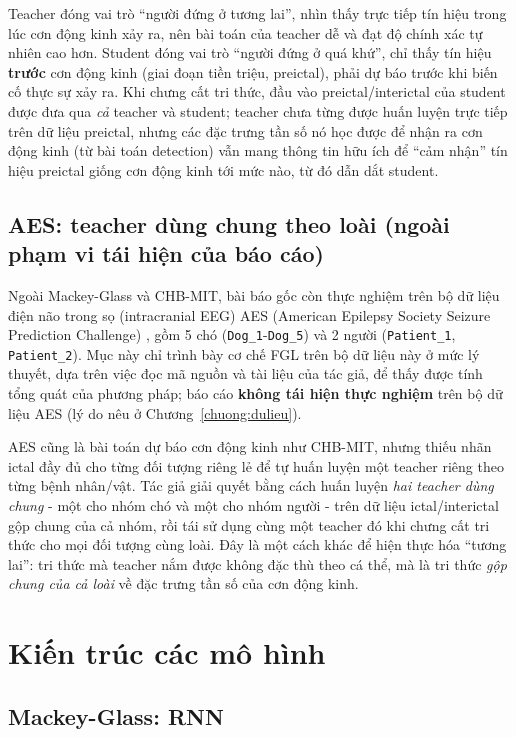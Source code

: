 Teacher đóng vai trò ``người đứng ở tương lai'', nhìn thấy trực tiếp tín hiệu trong lúc cơn
động kinh xảy ra, nên bài toán của teacher dễ và đạt độ chính xác tự nhiên cao hơn. Student
đóng vai trò ``người đứng ở quá khứ'', chỉ thấy tín hiệu \textbf{trước} cơn động kinh (giai
đoạn tiền triệu, preictal), phải dự báo trước khi biến cố thực sự xảy ra. Khi chưng cất tri
thức, đầu vào preictal/interictal của student được đưa qua \textit{cả} teacher và student;
teacher chưa từng được huấn luyện trực tiếp trên dữ liệu preictal, nhưng các đặc trưng tần số
nó học được để nhận ra cơn động kinh (từ bài toán detection) vẫn mang thông tin hữu ích để
``cảm nhận'' tín hiệu preictal giống cơn động kinh tới mức nào, từ đó dẫn dắt student.

\subsection{AES: teacher dùng chung theo loài (ngoài phạm vi tái hiện của báo cáo)}

Ngoài Mackey-Glass và CHB-MIT, bài báo gốc còn thực nghiệm trên bộ dữ liệu điện não trong sọ
(intracranial EEG) AES (American Epilepsy Society Seizure Prediction Challenge)
\cite{brinkmann2016aes}, gồm 5 chó (\texttt{Dog\_1}-\texttt{Dog\_5}) và 2 người
(\texttt{Patient\_1}, \texttt{Patient\_2}). Mục này chỉ trình bày cơ chế FGL trên bộ dữ liệu
này ở mức lý thuyết, dựa trên việc đọc mã nguồn và tài liệu của tác giả, để thấy được tính tổng
quát của phương pháp; báo cáo \textbf{không tái hiện thực nghiệm} trên bộ dữ liệu AES (lý do
nêu ở Chương~\ref{chuong:dulieu}).

AES cũng là bài toán dự báo cơn động kinh như CHB-MIT, nhưng thiếu nhãn ictal đầy đủ cho từng
đối tượng riêng lẻ để tự huấn luyện một teacher riêng theo từng bệnh nhân/vật. Tác giả giải
quyết bằng cách huấn luyện \textit{hai teacher dùng chung} - một cho nhóm chó và một cho
nhóm người - trên dữ liệu ictal/interictal gộp chung của cả nhóm, rồi tái sử dụng cùng một
teacher đó khi chưng cất tri thức cho mọi đối tượng cùng loài. Đây là một cách khác để hiện
thực hóa ``tương lai'': tri thức mà teacher nắm được không đặc thù theo cá thể, mà là tri thức
\textit{gộp chung của cả loài} về đặc trưng tần số của cơn động kinh.

\section{Kiến trúc các mô hình}
\label{sec:kientruc}

\subsection{Mackey-Glass: RNN}


